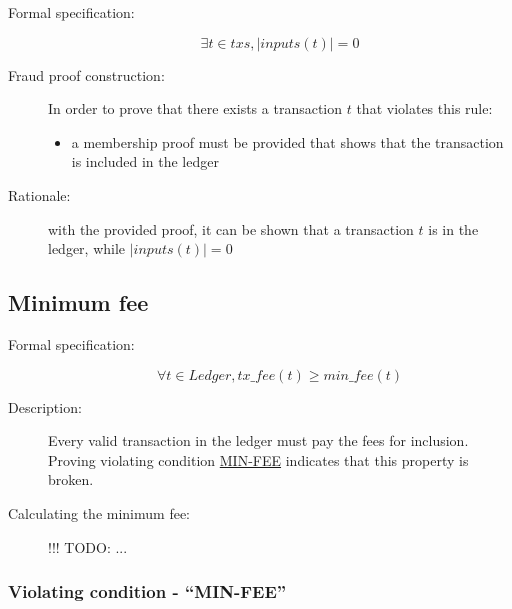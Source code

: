 \documentclass[../main.tex]{subfiles}
\begin{document}
\begin{description}

\item[Formal specification:]
\begin{equation*}
    \exists t \in txs, |inputs(t)| = 0
\end{equation*}

\item[Fraud proof construction:] In order to prove that there exists a transaction $t$ that violates this rule:
\begin{itemize}
    \item a membership proof must be provided that shows that the transaction is included in the ledger
\end{itemize}

\item[Rationale:] with the provided proof, it can be shown that a transaction $t$ is in the ledger, while $|inputs(t)| = 0$

\end{description}

\subsection{Minimum fee}

\begin{description}

\item[Formal specification:]
\begin{equation*}
    \forall t \in Ledger, tx\_fee(t) \geq min\_fee(t)
\end{equation*}

\item[Description:] Every valid transaction in the ledger must pay the fees for inclusion.
  Proving violating condition \hyperref[sec:MIN-FEE]{MIN-FEE} indicates that this property is broken.

\item[Calculating the minimum fee:] !!! TODO: ...

\end{description}

\subsubsection{Violating condition - ``MIN-FEE''}
\label{sec:MIN-FEE}
\end{document}
